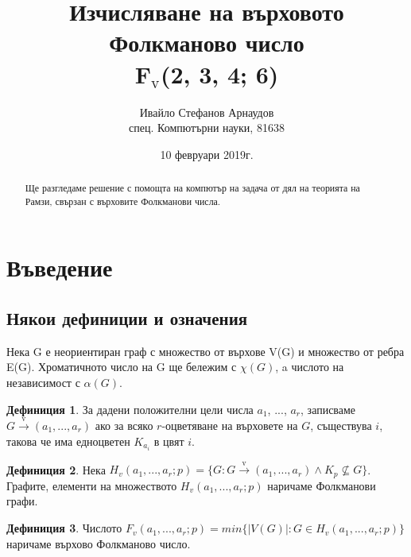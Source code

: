 \documentclass[letterpaper,12pt]{article}
\theoremstyle{definition}
\newtheorem{definition}{Дефиниция}[section]
\begin{document}
\title{Изчисляване на върховото Фолкманово число \\ F$_{\text{v}}$(2, 3, 4; 6)}
\author{Ивайло Стефанов Арнаудов \\ \small{спец. Компютърни науки, 81638}}
\date{10 февруари 2019г.}
\maketitle

\newtheorem{theorem}{Твърдение}[section]
\newtheorem{signify}{Означение}[section]

\begin{abstract}
Ще разгледаме решение с помощта на компютър на задача от дял на теорията на Рамзи, свързан с върховите Фолкманови числа.
\end{abstract}

\section{Въведение}

\subsection{Някои дефиниции и означения}

Нека G е неориентиран граф с множество от върхове V(G) и множество от ребра E(G). Хроматичното число на G ще бележим с  $\chi(G)$, a числото на независимост с $\alpha(G)$.

\begin{definition}

За дадени положителни цели числа $a_1$, $...$, $a_r$, записваме $G \xrightarrow{\text{v}} (a_1,..., a_r)$ ако за всяко $r$-оцветяване на върховете на $G$, съществува $i$, такова че има едноцветен $K_{a_i}$ в цвят $i$.

\end{definition}

\begin{definition}
Нека $H_v(a_1,..., a_r;p) = \{G : G \xrightarrow{\text{v}} (a_1, ..., a_r) \land K_p \nsubseteq G \}$. Графите, елементи на множеството $H_v(a_1,..., a_r;p)$ наричаме Фолкманови графи. 
\end{definition}

\begin{definition} Числото $F_v(a_1,...,a_r;p) = min \{|V(G)| : G \in H_v(a_1,...,a_r;p)\}$ наричаме върхово Фолкманово число.
\end{definition}
\end{document}
